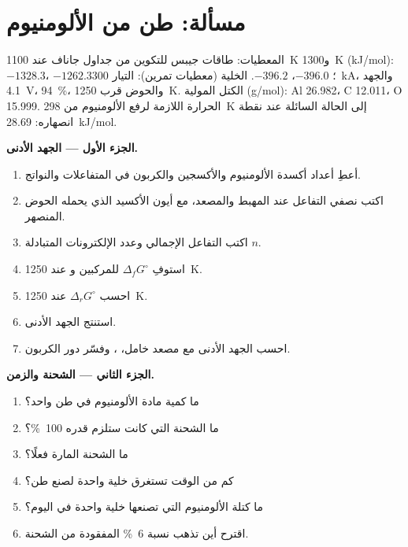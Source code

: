 \section{مسألة: طن من الألومنيوم}

\begin{problem}
\label{pb:b2:batteries-electrolysis:1}
المعطيات: طاقات جيبس للتكوين من جداول جاناف عند \qty{1100}{K} و\qty{1300}{K}
(\unit{kJ/mol}):  $-1328.3$، $-1262.3$؛  $-396.0$، $-396.2$. الخلية
(معطيات تمرين): التيار \qty{300}{kA}، والجهد \qty{4.1}{V}، 
94~\%، والحوض قرب \qty{1250}{K}. الكتل المولية (\unit{g/mol}): Al 26.982، C 12.011،
O 15.999. الحرارة اللازمة لرفع الألومنيوم من \qty{298}{K} إلى الحالة السائلة عند
نقطة انصهاره: \qty{28.69}{kJ/mol}.

\medskip
\noindent\textbf{الجزء الأول --- الجهد الأدنى.}
\begin{enumerate}
  \item أعطِ أعداد أكسدة الألومنيوم والأكسجين والكربون في
        المتفاعلات والنواتج.
  \item اكتب نصفي التفاعل عند المهبط والمصعد، مع أيون الأكسيد
         الذي يحمله الحوض المنصهر.
  \item اكتب التفاعل الإجمالي وعدد الإلكترونات المتبادلة $n$.
  \item استوفِ $\Delta_f G^\circ$ للمركبين  و عند \qty{1250}{K}.
  \item احسب $\Delta_r G^\circ$ عند \qty{1250}{K}.
  \item استنتج الجهد الأدنى.
  \item احسب الجهد الأدنى مع مصعد خامل،
        ، وفسّر دور الكربون.
\end{enumerate}

\medskip
\noindent\textbf{الجزء الثاني --- الشحنة والزمن.}
\begin{enumerate}[resume]
  \item ما كمية مادة الألومنيوم في طن واحد؟
  \item ما الشحنة التي كانت ستلزم  قدره 100~\%؟
  \item ما الشحنة المارة فعلًا؟
  \item كم من الوقت تستغرق خلية واحدة لصنع طن؟
  \item ما كتلة الألومنيوم التي تصنعها خلية واحدة في اليوم؟
  \item اقترح أين تذهب نسبة 6~\% المفقودة من الشحنة.
\end{enumerate}


\end{problem}
